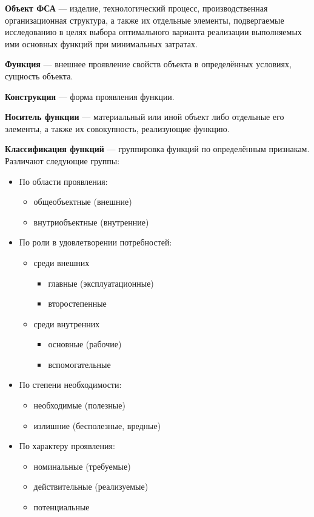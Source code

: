 \textbf{Объект ФСА} --- изделие, технологический процесс, производственная
организационная структура, а также их отдельные элементы, подвергаемые
исследованию в целях выбора оптимального варианта реализации выполняемых ими
основных функций при минимальных затратах.

\textbf{Функция} --- внешнее проявление свойств объекта в определённых
условиях, сущность объекта.

\textbf{Конструкция} --- форма проявления функции.

\textbf{Носитель функции} --- материальный или иной объект либо отдельные
его элементы, а также их совокупность, реализующие функцию.

\textbf{Классификация функций} --- группировка функций по определённым
признакам.
Различают следующие группы:
\begin{itemize}
    \item По области проявления:
        \begin{itemize}
            \item общеобъектные (внешние)
            \item внутриобъектные (внутренние)
        \end{itemize}
    \item По роли в удовлетворении потребностей:
        \begin{itemize}
            \item среди внешних
                \begin{itemize}
                    \item главные (эксплуатационные)
                    \item второстепенные
                \end{itemize}
            \item среди внутренних
                \begin{itemize}
                    \item основные (рабочие)
                    \item вспомогательные
                \end{itemize}
        \end{itemize}
    \item По степени необходимости:
        \begin{itemize}
            \item необходимые (полезные)
            \item излишние (бесполезные, вредные)
        \end{itemize}
    \item По характеру проявления:
        \begin{itemize}
            \item номинальные (требуемые)
            \item действительные (реализуемые)
            \item потенциальные
        \end{itemize}
\end{itemize}

